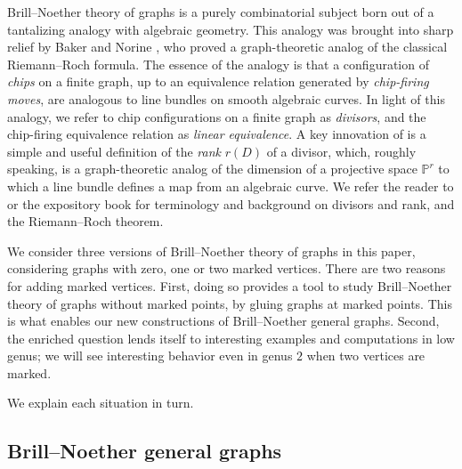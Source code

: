 \documentclass[11pt]{article}
\theoremstyle{definition}
\numberwithin{equation}{section}
\begin{document}
Brill--Noether theory of graphs is a purely combinatorial subject born out of a tantalizing analogy with algebraic geometry. This analogy was brought into sharp relief by Baker and Norine \cite{BakNor07}, who proved a graph-theoretic analog of the classical Riemann--Roch formula. The essence of the analogy is that a configuration of \emph{chips} on a finite graph, up to an equivalence relation generated by \emph{chip-firing moves}, are analogous to line bundles on smooth algebraic curves. In light of this analogy, we refer to chip configurations on a finite graph as \emph{divisors}, and the chip-firing equivalence relation as \emph{linear equivalence}. A key innovation of \cite{BakNor07} is a simple and useful definition of the \emph{rank} $r(D)$ of a divisor, which, roughly speaking, is a graph-theoretic analog of the dimension of a projective space $\mathbb{P}^r$ to which a line bundle defines a map from an algebraic curve. We refer the reader to \cite{BakNor07} or the expository book \cite{corry2018divisors} for terminology and background on divisors and rank, and the Riemann--Roch theorem.

We consider three versions of Brill--Noether theory of graphs in this paper, considering graphs with zero, one or two marked vertices. There are two reasons for adding marked vertices. First, doing so provides a tool to study Brill--Noether theory of graphs without marked points, by gluing graphs at marked points. This is what enables our new constructions of Brill--Noether general graphs. Second, the enriched question lends itself to interesting examples and computations in low genus; we will see interesting behavior even in genus $2$ when two vertices are marked.

We explain each situation in turn.

\subsection{Brill--Noether general graphs}
\end{document}
